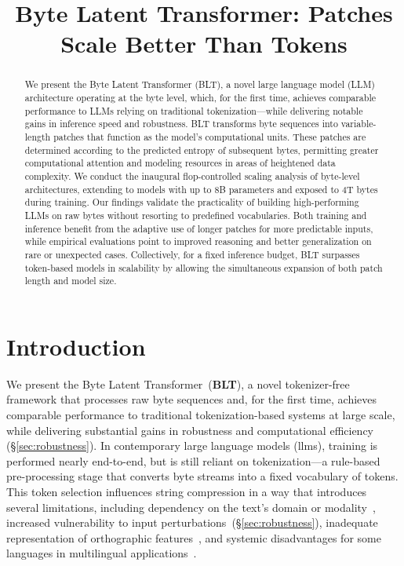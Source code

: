 \title{Byte Latent Transformer: Patches Scale Better Than Tokens}

\begin{abstract}
We present the Byte Latent Transformer ({\textsc BLT}), a novel large language model (LLM) architecture operating at the byte level, which, for the first time, achieves comparable performance to LLMs relying on traditional tokenization—while delivering notable gains in inference speed and robustness. {\textsc BLT} transforms byte sequences into variable-length patches that function as the model’s computational units. These patches are determined according to the predicted entropy of subsequent bytes, permitting greater computational attention and modeling resources in areas of heightened data complexity. We conduct the inaugural flop-controlled scaling analysis of byte-level architectures, extending to models with up to 8B parameters and exposed to 4T bytes during training. Our findings validate the practicality of building high-performing LLMs on raw bytes without resorting to predefined vocabularies. Both training and inference benefit from the adaptive use of longer patches for more predictable inputs, while empirical evaluations point to improved reasoning and better generalization on rare or unexpected cases. Collectively, for a fixed inference budget, {\textsc BLT} surpasses token-based models in scalability by allowing the simultaneous expansion of both patch length and model size.
\end{abstract}

\section{Introduction}
\label{section:intro}

We present the Byte Latent Transformer~(\textbf{BLT}), a novel tokenizer-free framework that processes raw byte sequences and, for the first time, achieves comparable performance to traditional tokenization-based systems at large scale, while delivering substantial gains in robustness and computational efficiency (\S\ref{sec:robustness}).
In contemporary large language models (llms), training is performed nearly end-to-end, but is still reliant on tokenization—a rule-based pre-processing stage that converts byte streams into a fixed vocabulary of tokens. This token selection influences string compression in a way that introduces several limitations, including dependency on the text's domain or modality~\citep{dagangetting}, increased vulnerability to input perturbations~(\S\ref{sec:robustness}), inadequate representation of orthographic features~\citep{edman2024cute}, and systemic disadvantages for some languages in multilingual applications~\citep{liang2023xlm,petrov2024language,limisiewicz2024myte}.

